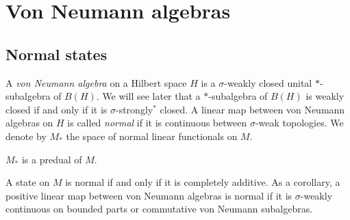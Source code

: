 \documentclass{../../large}
\begin{document}
\chapter{Von Neumann algebras}

\section{Normal states}

\begin{prb}
A \emph{von Neumann algebra} on a Hilbert space $H$ is a $\sigma$-weakly closed unital $*$-subalgebra of $B(H)$.
We will see later that a $*$-subalgebra of $B(H)$ is weakly closed if and only if it is $\sigma$-strongly$^*$ closed.
A linear map between von Neumann algebras on $H$ is called \emph{normal} if it is continuous between $\sigma$-weak topologies.
We denote by $M_*$ the space of normal linear functionals on $M$.
\begin{parts}
\item $M_*$ is a predual of $M$.
\item A state on $M$ is normal if and only if it is completely additive.
As a corollary, a positive linear map between von Neumann algebras is normal if it is $\sigma$-weakly continuous on bounded parts or commutative von Neumann subalgebras.
\end{parts}
\end{prb}
\end{document}
